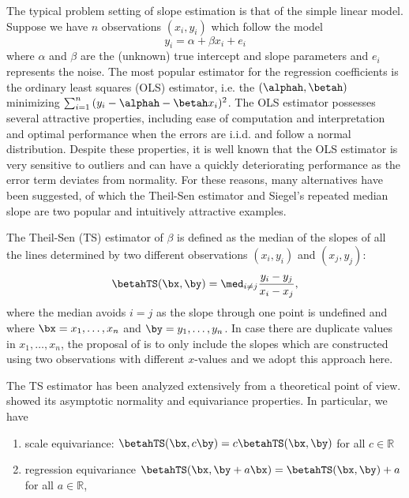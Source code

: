 The typical problem setting of slope estimation is that of the simple linear model. Suppose we have $n$ observations $(x_i, y_i)$ which follow the model
\begin{equation*}
y_i = \alpha + \beta x_i + e_i
\end{equation*}
where $\alpha$ and $\beta$ are the (unknown) true intercept and slope parameters and $e_i$ represents the noise. The most popular estimator for the regression coefficients is the ordinary least squares (OLS) estimator, i.e. the $(\alphah, \betah)$ minimizing $\sum_{i=1}^{n}{(y_i - \alphah-\betah x_i)^2}$. The OLS estimator possesses several attractive properties, including ease of computation and interpretation and optimal performance when the errors are i.i.d. and follow a normal distribution. Despite these properties, it is well known that the OLS estimator is very sensitive to outliers and can have a quickly deteriorating performance as the error term deviates from normality. For these reasons, many alternatives have been suggested, of which the Theil-Sen estimator and Siegel's repeated median slope are two popular and intuitively attractive examples.\par
The Theil-Sen (TS) estimator \citep{Theil1950, sen1968estimates} of $\beta$ is defined as the median of the slopes of all the lines determined by two different observations $(x_i,y_i)$ and $(x_j, y_j)$:
\begin{equation*}
\betahTS(\bx,\by)=\med_{i\neq j} \frac{y_i - y_j}{x_i - x_j},
\end{equation*}
where the median avoids $i=j$ as the slope through one point is undefined and where $\bx = x_1, \ldots, x_n$ and $\by = y_1, \ldots, y_n$. In case there are duplicate values in $x_1,\ldots,x_n$, the proposal of \cite{sen1968estimates} is to only include the slopes which are constructed using two observations with different $x$-values and we adopt this approach here.\par
The TS estimator has been analyzed extensively from a theoretical point of view. \cite{sen1968estimates} showed its asymptotic normality and equivariance properties. In particular, we have
\begin{enumerate}
\item scale equivariance: $\betahTS(\bx,c\by ) = c\betahTS(\bx,\by) $ for all $c \in \mathbb{R}$
\item regression equivariance $\betahTS(\bx,\by + a\bx) = \betahTS(\bx,\by)  + a$ for all $a \in \mathbb{R}$,
\end{enumerate}
